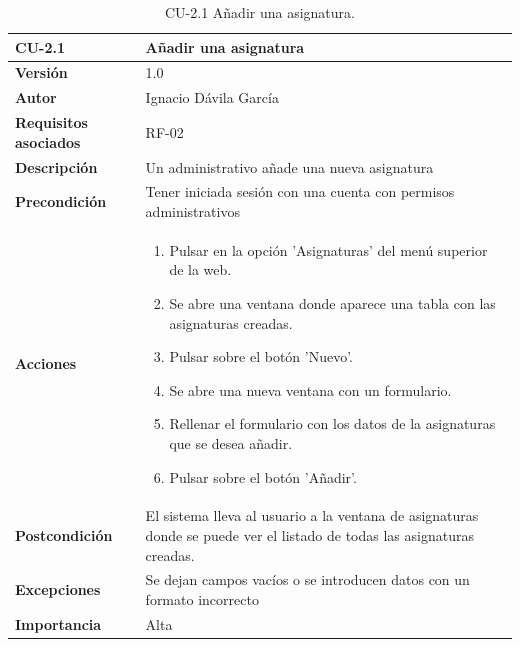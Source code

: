 \begin{table}[p]
	\centering
	\begin{tabularx}{\linewidth}{ p{} p{} }
		\toprule
		\textbf{CU-2.1}    & \textbf{Añadir una asignatura}\\
		\toprule
		\textbf{Versión}              & 1.0    \\
		\textbf{Autor}                & Ignacio Dávila García \\
		\textbf{Requisitos asociados} & RF-02 \\
		\textbf{Descripción}          & Un administrativo añade una nueva asignatura \\
		\textbf{Precondición}         & Tener iniciada sesión con una cuenta con permisos administrativos \\
		\textbf{Acciones}             &
		\begin{enumerate}
			\def\labelenumi{\arabic{enumi}.}
			\tightlist
			\item Pulsar en la opción 'Asignaturas' del menú superior de la web.
			\item Se abre una ventana donde aparece una tabla con las asignaturas creadas.
			\item Pulsar sobre el botón 'Nuevo'.
			\item Se abre una nueva ventana con un formulario.
			\item Rellenar el formulario con los datos de la asignaturas que se desea añadir.
			\item Pulsar sobre el botón 'Añadir'.
		\end{enumerate}\\
		\textbf{Postcondición}        & El sistema lleva al usuario a la ventana de asignaturas donde se puede ver el listado de todas las asignaturas creadas. \\
		\textbf{Excepciones}          & Se dejan campos vacíos o se introducen datos con un formato incorrecto \\
		\textbf{Importancia}          & Alta \\
		\bottomrule
	\end{tabularx}
	\caption{CU-2.1 Añadir una asignatura.}
\end{table}

